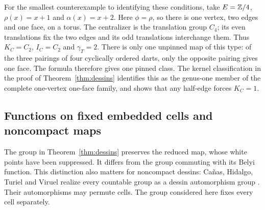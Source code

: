 For the smallest counterexample to identifying these conditions, take
$E=\mathbb Z/4$, $\rho(x)=x+1$ and $\alpha(x)=x+2$.
Here $\phi=\rho$, so there is one vertex, two edges and one face,
on a torus. The centralizer is the translation group $C_4$; its even
translations fix the two edges and its odd translations interchange
them. Thus $K_C=C_2$, $I_C=C_2$ and $\gamma_T=2$.
There is only one unpinned map of this type: of the three pairings
of four cyclically ordered darts, only the opposite pairing gives
one face. The formula therefore gives one pinned class. The kernel
classification in the proof of Theorem~\ref{thm:dessins} identifies
this as the genus-one member of the complete one-vertex one-face
family, and shows that any half-edge forces $K_C=1$.

\subsection{Functions on fixed embedded cells and noncompact maps}
The group in Theorem~\ref{thm:dessins} preserves the reduced map,
whose white points have been suppressed. It differs from the group
commuting with its Belyi function. This distinction also matters for
noncompact dessins: Cañas, Hidalgo, Turiel and Viruel realize every
countable group as a dessin automorphism group
\cite[Theorems~1--2, p.~3; Section~2.3, p.~4]{Canas}.
Their automorphisms may permute cells. The group considered here
fixes every cell separately.

